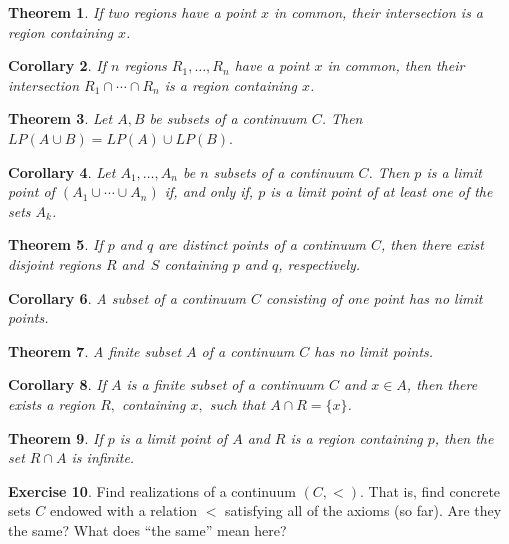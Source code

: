 \documentclass[11pt]{article}
\renewcommand{\_}[1]{\underline{ #1 }}
\newtheorem{theorem}{Theorem}[section]
\newtheorem{corollary}[theorem]{Corollary}
\theoremstyle{definition}
\newtheorem{exercise}[theorem]{Exercise}
\numberwithin{equation}{subsection}
\begin{document}
\begin{theorem}  If two regions have a point $x$ in common, their intersection is a region containing $x$.
\end{theorem}

\begin{corollary}  If $n$ regions $R_1, \dotsc, R_n$ have a point $x$ in common, then their intersection $R_1 \cap \dotsm \cap R_n$ is a region containing $x$.
\end{corollary}

\begin{theorem}  Let $A, B$ be subsets of a continuum $C$.  Then  $LP(A \cup B)=LP(A)\cup LP(B).$
\end{theorem}



\begin{corollary}
Let $A_1, \dotsc, A_n$ be $n$ subsets of a continuum $C$.  Then  $p$ is a limit point of $(A_1 \cup \dotsm \cup A_n)$ if, and only if, $p$ is a limit point of at least one of the sets $A_k$.
\end{corollary}



\begin{theorem}  If $p$ and $q$ are distinct points of a continuum $C$, then there exist disjoint regions $R$ and~$S$ containing $p$ and $q$, respectively.
\end{theorem}

\begin{corollary}  A subset of a continuum $C$ consisting of one point has no limit points.
\end{corollary}

\begin{theorem} A finite subset $A$ of a continuum $C$ has no limit points.
\end{theorem}

\begin{corollary}  If $A$ is a finite subset of a continuum $C$ and $x \in A$, then there exists a region $R,$ containing $x,$ such that $A \cap R = \{ x \}$.
\end{corollary}


\begin{theorem}  If $p$ is a limit point of $A$ and $R$ is a region containing $p$, then the set $R \cap A$ is infinite.
\end{theorem}

\begin{exercise}  Find realizations of a continuum $(C, <)$.  That is, find concrete sets $C$ endowed with a relation $<$ satisfying all of the axioms (so far).  Are they the same?  What does ``the same'' mean here?
\end{exercise}
\bigskip
\end{document}
